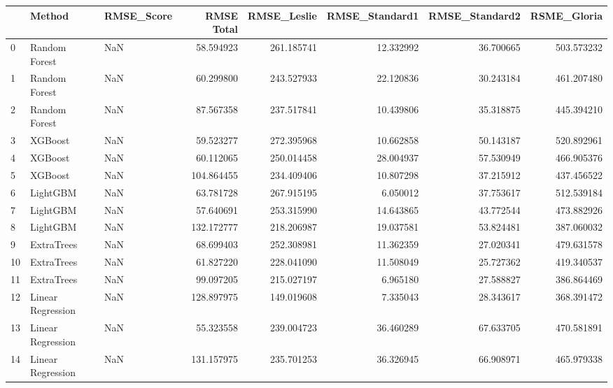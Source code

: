 \begin{tabular}{lllrrrrr}
\toprule
{} &             Method & RMSE\_Score &  RMSE Total &  RMSE\_Leslie &  RMSE\_Standard1 &  RMSE\_Standard2 &  RSME\_Gloria \\
\midrule
0  &      Random Forest &        NaN &   58.594923 &   261.185741 &       12.332992 &       36.700665 &   503.573232 \\
1  &      Random Forest &        NaN &   60.299800 &   243.527933 &       22.120836 &       30.243184 &   461.207480 \\
2  &      Random Forest &        NaN &   87.567358 &   237.517841 &       10.439806 &       35.318875 &   445.394210 \\
3  &            XGBoost &        NaN &   59.523277 &   272.395968 &       10.662858 &       50.143187 &   520.892961 \\
4  &            XGBoost &        NaN &   60.112065 &   250.014458 &       28.004937 &       57.530949 &   466.905376 \\
5  &            XGBoost &        NaN &  104.864455 &   234.409406 &       10.807298 &       37.215912 &   437.456522 \\
6  &           LightGBM &        NaN &   63.781728 &   267.915195 &        6.050012 &       37.753617 &   512.539184 \\
7  &           LightGBM &        NaN &   57.640691 &   253.315990 &       14.643865 &       43.772544 &   473.882926 \\
8  &           LightGBM &        NaN &  132.172777 &   218.206987 &       19.037581 &       53.824481 &   387.060032 \\
9  &         ExtraTrees &        NaN &   68.699403 &   252.308981 &       11.362359 &       27.020341 &   479.631578 \\
10 &         ExtraTrees &        NaN &   61.827220 &   228.041090 &       11.508049 &       25.727362 &   419.340537 \\
11 &         ExtraTrees &        NaN &   99.097205 &   215.027197 &        6.965180 &       27.588827 &   386.864469 \\
12 &  Linear Regression &        NaN &  128.897975 &   149.019608 &        7.335043 &       28.343617 &   368.391472 \\
13 &  Linear Regression &        NaN &   55.323558 &   239.004723 &       36.460289 &       67.633705 &   470.581891 \\
14 &  Linear Regression &        NaN &  131.157975 &   235.701253 &       36.326945 &       66.908971 &   465.979338 \\
\bottomrule
\end{tabular}
